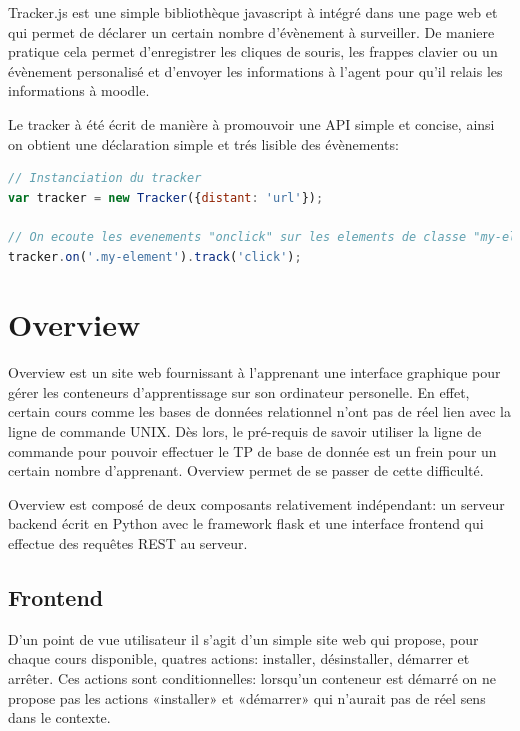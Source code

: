 \documentclass[a4paper,11pt]{report}
\begin{document}
Tracker.js est une simple bibliothèque javascript à intégré dans une page web et qui permet de déclarer un certain nombre d'évènement à surveiller.
De maniere pratique cela permet d'enregistrer les cliques de souris, les frappes clavier ou un évènement personalisé et d'envoyer les informations à l'agent pour qu'il relais les informations à moodle.

Le tracker à été écrit de manière à promouvoir une API simple et concise, ainsi on obtient une déclaration simple et trés lisible des évènements:

\begin{lstlisting}[language=javascript, caption={Exemple d'utilisation de tracker.js}]
// Instanciation du tracker
var tracker = new Tracker({distant: 'url'});

// On ecoute les evenements "onclick" sur les elements de classe "my-element"
tracker.on('.my-element').track('click');
\end{lstlisting}

\section{Overview}

Overview est un site web fournissant à l'apprenant une interface graphique pour gérer les conteneurs d'apprentissage sur son ordinateur personelle.
En effet, certain cours comme les bases de données relationnel n'ont pas de réel lien avec la ligne de commande UNIX. Dès lors, le pré-requis de savoir utiliser la ligne de commande pour pouvoir effectuer le TP de base de donnée est un frein pour un certain nombre d'apprenant. Overview permet de se passer de cette difficulté.

Overview est composé de deux composants relativement indépendant: un serveur backend écrit en Python avec le framework flask et une interface frontend qui effectue des requêtes REST au serveur.

\subsection{Frontend}

D'un point de vue utilisateur il s'agit d'un simple site web qui propose, pour chaque cours disponible, quatres actions: installer, désinstaller, démarrer et arrêter. Ces actions sont conditionnelles: lorsqu'un conteneur est démarré on ne propose pas les actions «installer» et «démarrer» qui n'aurait pas de réel sens dans le contexte.
\end{document}
